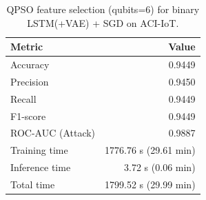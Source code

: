 \begin{table}[t]
\centering
\caption{QPSO feature selection (qubits=6) for binary LSTM(+VAE) + SGD on ACI-IoT.}\n\label{tab:qpso_baseline}\n\begin{tabular}{l r}
\hline
Metric & Value \\ \hline
Accuracy & 0.9449 \\ 
Precision & 0.9450 \\ 
Recall & 0.9449 \\ 
F1-score & 0.9449 \\ 
ROC-AUC (Attack) & 0.9887 \\ 
Training time & 1776.76 s (29.61 min) \\ 
Inference time & 3.72 s (0.06 min) \\ 
Total time & 1799.52 s (29.99 min) \\ 
\hline
\end{tabular}
\end{table}
